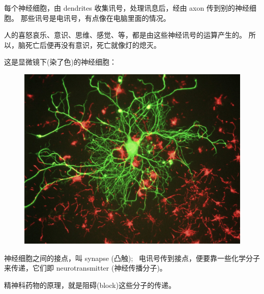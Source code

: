 \documentclass[12pt]{report}
\newcommand{\cc}[2]{#1}
\newcommand{\cc}[2]{#2}
\begin{document}
{\cc{
每个神经细胞，由 dendrites 收集讯号，处理讯息后，经由 axon 传到别的神经细胞。 那些讯号是电讯号，有点像在电脑里面的情况。
}{
\textbf{Dendrites} collect signals, which, after processing, are sent via \textbf{axons} to other neurons.  The signals are electrical signals, somewhat similar to signals in a computer chip.
}

\cc{
人的喜怒哀乐、意识、思维、感觉、等，都是由这些神经讯号的运算产生的。 所以，脑死亡后便再没有意识，死亡就像灯的熄灭。
}{
A person's emotions (eg. happiness, anger, sadness) and his consciousness, cognition, and perception, etc, are all \textbf{manifestations} of such neural signals.  Therefore, when the brain is dead our consciousness ceases to exist, much like the extinguishing of a light bulb.
}

\cc{
这是显微镜下(染了色)的神经细胞：
}{
This is a real neuron under the microscope (with fluorescence pigmentation):
}
\begin{figure}[H]
\centering
\includegraphics[scale=0.25]{neuron_in_tissue_culture.jpg}
\end{figure}

\cc{
神经细胞之间的接点，叫 synapse (凸触); \ 电讯号传到接点，便要靠一些化学分子来传递，它们即 neurotransmitter (神经传播分子)。
}{
The contact points between neurons are called \textbf{synapses}.  When an electrical signal reaches the synapse, it relies on chemical molecules to relay that signal, these are called \textbf{neurotransmitters}.
}

\cc{
精神科药物的原理，就是阻碍(block)这些分子的传递。
}{
All psychiatric drugs \footnote{including anti-psychotic drugs for treating psychosis, but also drugs for treating depression, anxiety, attention deficit, etc} work by \textbf{blocking} the signal transmission of such molecules.
}

}
\end{document}
